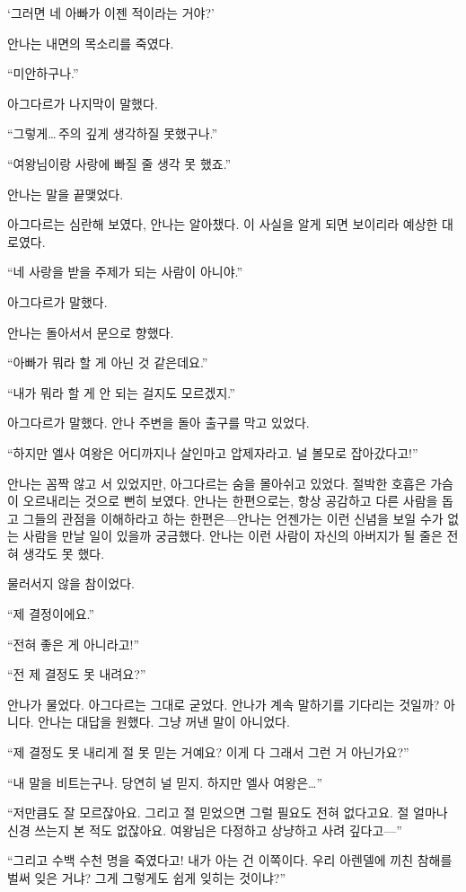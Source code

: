 `그러면 네 아빠가 이젠 적이라는 거야?'

안나는 내면의 목소리를 죽였다.

``미안하구나.''

아그다르가 나지막이 말했다.

``그렇게\ldots\,주의 깊게 생각하질 못했구나.''

``여왕님이랑 사랑에 빠질 줄 생각 못 했죠.''

안나는 말을 끝맺었다.

아그다르는 심란해 보였다, 안나는 알아챘다. 이 사실을 알게 되면 보이리라 예상한 대로였다.

``네 사랑을 받을 주제가 되는 사람이 아니야.''

아그다르가 말했다.

안나는 돌아서서 문으로 향했다.

``아빠가 뭐라 할 게 아닌 것 같은데요.''

``내가 뭐라 할 게 안 되는 걸지도 모르겠지.''

아그다르가 말했다. 안나 주변을 돌아 출구를 막고 있었다.

``하지만 엘사 여왕은 어디까지나 살인마고 압제자라고. 널 볼모로 잡아갔다고!''

안나는 꼼짝 않고 서 있었지만, 아그다르는 숨을 몰아쉬고 있었다. 절박한 호흡은 가슴이 오르내리는 것으로 뻔히 보였다. 안나는 한편으로는, 항상 공감하고 다른 사람을 돕고 그들의 관점을 이해하라고 하는 한편은—안나는 언젠가는 이런 신념을 보일 수가 없는 사람을 만날 일이 있을까 궁금했다. 안나는 이런 사람이 자신의 아버지가 될 줄은 전혀 생각도 못 했다.

물러서지 않을 참이었다.

``제 결정이에요.''

``전혀 좋은 게 아니라고!''

``전 제 결정도 못 내려요?''

안나가 물었다. 아그다르는 그대로 굳었다. 안나가 계속 말하기를 기다리는 것일까? 아니다. 안나는 대답을 원했다. 그냥 꺼낸 말이 아니었다.

``제 결정도 못 내리게 절 못 믿는 거예요? 이게 다 그래서 그런 거 아닌가요?''

``내 말을 비트는구나. 당연히 널 믿지. 하지만 엘사 여왕은\ldots''

``저만큼도 잘 모르잖아요. 그리고 절 믿었으면 그럴 필요도 전혀 없다고요. 절 얼마나 신경 쓰는지 본 적도 없잖아요. 여왕님은 다정하고 상냥하고 사려 깊다고—''

``그리고 수백 수천 명을 죽였다고! 내가 아는 건 이쪽이다. 우리 아렌델에 끼친 참해를 벌써 잊은 거냐? 그게 그렇게도 쉽게 잊히는 것이냐?''

